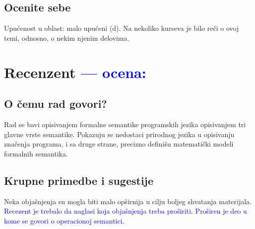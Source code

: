 \documentclass[a4paper]{report}
\newcommand{\odgovor}[1]{\textcolor{blue}{#1}}
\begin{document}
\section{Ocenite sebe}

{Upućenost u oblast: malo upućeni (d). Na nekoliko kurseva je bilo reči o ovoj temi, odnosno, o nekim njenim delovima.}

\chapter{Recenzent \odgovor{--- ocena:}}

\section{O čemu rad govori?}
Rad se bavi opisivanjem formalne semantike programskih jezika opisivanjem tri glavne vrste semantike. Pokazuju se nedostaci prirodnog jezika u opisivanju značenja programa, i sa druge strane, precizno definišu matematički modeli formalnih semantika.

\section{Krupne primedbe i sugestije}
Neka objašnjenja su mogla biti malo opširnija u cilju  boljeg shvatanja materijala.
\odgovor{Recezent je trebalo da naglasi koja objašnjenja treba proširiti. Proširen je deo u kome se govori o operacionoj semantici.}
\end{document}
